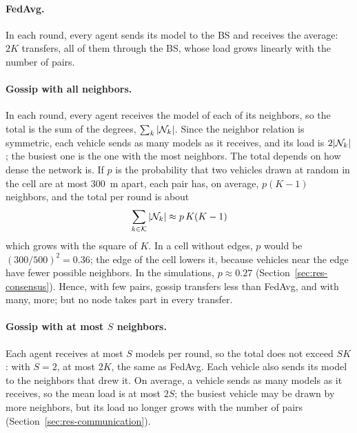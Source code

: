 \paragraph{FedAvg.} In each round, every agent sends its model to the \ac{BS} and receives the average: $2K$
transfers, all of them through the \ac{BS}, whose load grows linearly with the number of pairs.

\paragraph{Gossip with all neighbors.} In each round, every agent receives the model of each of its
neighbors, so the total is the sum of the degrees, $\textstyle\sum_k |\mathcal{N}_k|$. Since the neighbor relation is
symmetric, each vehicle sends as many models as it receives, and its load is $2|\mathcal{N}_k|$; the busiest one is
the one with the most neighbors. The total depends on how dense the network is. If $p$ is the probability that
two vehicles drawn at random in the cell are at most \SI{300}{\meter} apart, each pair has, on average,
$p(K-1)$ neighbors, and the total per round is about
\begin{equation}
  \sum_{k \in \mathcal{K}} |\mathcal{N}_k| \approx p\, K (K - 1)
  \label{eq:pa-cost-gossip}
\end{equation}
which grows with the square of $K$. In a cell without edges, $p$ would be $(300/500)^2 = 0.36$; the edge of
the cell lowers it, because vehicles near the edge have fewer possible neighbors. In the simulations,
$p \approx 0.27$ (Section~\ref{sec:res-consensus}). Hence, with few pairs, gossip transfers less than
\ac{FedAvg}, and with many, more; but no node takes part in every transfer.

\paragraph{Gossip with at most $S$ neighbors.} Each agent receives at most $S$ models per round, so the total
does not exceed $SK$: with $S = 2$, at most $2K$, the same as \ac{FedAvg}. Each vehicle also sends its model
to the neighbors that drew it. On average, a vehicle sends as many models as it receives, so the mean load is
at most $2S$; the busiest vehicle may be drawn by more neighbors, but its load no longer grows with the number
of pairs (Section~\ref{sec:res-communication}).

